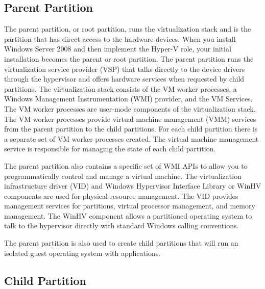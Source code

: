 \vspace{5mm}
\subsection{Parent Partition}
\vspace{5mm}

The parent partition, or root partition, runs the virtualization stack and is the partition that has direct access to the hardware devices. When you install Windows Server
2008 and then implement the Hyper-V role, your initial installation becomes the parent or root partition. The parent partition runs the virtualization service provider (VSP) that talks
directly to the device drivers through the hypervisor and offers hardware services when requested by child partitions. The virtualization stack consists of the VM worker processes,
a Windows Management Instrumentation (WMI) provider, and the VM Services. The VM worker processes are user-mode components of the virtualization stack.
The VM worker processes provide virtual machine management (VMM) services from the parent partition to the child partitions. For each child partition there is a separate set of VM worker processes created. The virtual machine management service is responsible for managing the state of each child partition.

\vspace{5mm}

The parent partition also contains a specific set of WMI APIs to allow you to programmatically control and manage a virtual machine. The virtualization infrastructure driver
(VID) and Windows Hypervisor Interface Library or WinHV components are used for physical resource management. The VID provides management services for partitions, virtual processor management, and memory management. The WinHV component allows a partitioned operating system to talk to the hypervisor directly with standard Windows calling conventions.

\vspace{5mm}

The parent partition is also used to create child partitions that will run an isolated guest operating system with applications.

\vspace{5mm}
\subsection{Child Partition}
\vspace{5mm}

